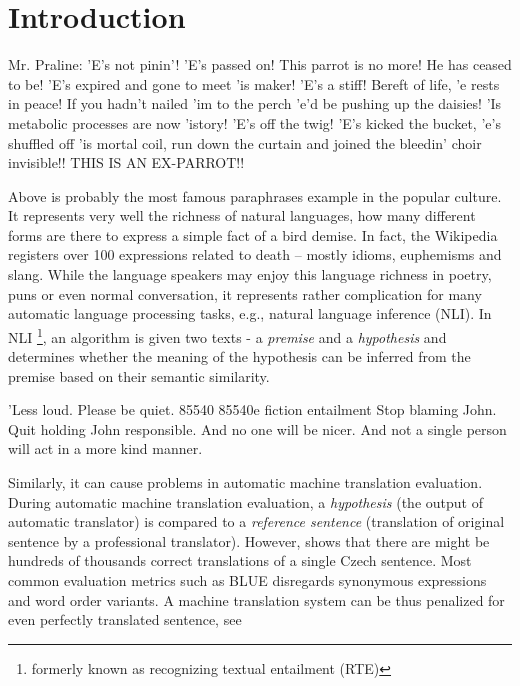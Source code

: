 \chapter*{Introduction}


Mr. Praline: 'E's not pinin'! 'E's passed on! This parrot is no more! He has ceased to be! 'E's expired and gone to meet 'is maker! 'E's a stiff! Bereft of life, 'e rests in peace! If you hadn't nailed 'im to the perch 'e'd be pushing up the daisies! 'Is metabolic processes are now 'istory! 'E's off the twig! 'E's kicked the bucket, 'e's shuffled off 'is mortal coil, run down the curtain and joined the bleedin' choir invisible!! THIS IS AN EX-PARROT!! \cite{parrot}

Above is probably the most famous paraphrases example in the popular culture. 
It represents very well the richness of natural languages, how many different forms are there to express a simple fact of a bird demise. 
In fact, the Wikipedia registers over 100 expressions related to death -- mostly idioms, euphemisms and slang.  \citep{wiki:death} 
While the language speakers may enjoy this language richness in poetry, puns or even normal conversation, it represents rather complication for many automatic language processing tasks, e.g., natural language inference (NLI).
In NLI \footnote{formerly known as recognizing textual entailment (RTE)}, an algorithm is given two texts - a \emph{premise} and a \emph{hypothesis} and determines whether the meaning of the hypothesis can be inferred from the premise based on their semantic similarity. \citep{dagan:2005}


'Less loud.     Please be quiet.        85540   85540e  fiction entailment
Stop blaming John.      Quit holding John responsible.
And no one will be nicer.       And not a single person will act in a more kind manner.


Similarly, it can cause problems in automatic machine translation evaluation. 
During automatic machine translation evaluation, a \emph{hypothesis} (the output of automatic translator) is compared to a \emph{reference sentence} (translation of original sentence by a professional translator). 
However, \citep{bojar-scratching} shows that there are might be hundreds of thousands correct translations of a single Czech sentence.
Most common evaluation metrics such as BLUE \citep{bleu} disregards synonymous expressions and word order variants.
A machine translation system can be thus penalized for even perfectly translated sentence, see 

